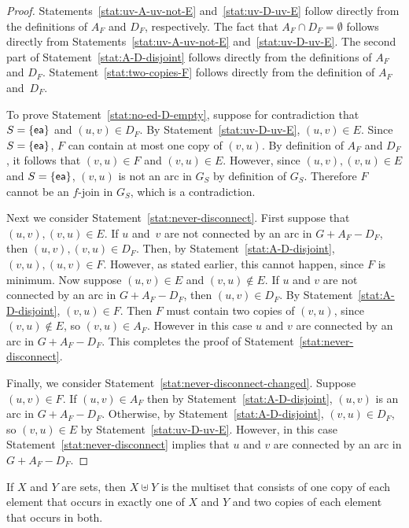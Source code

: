\documentclass[11pt]{llncs}
\newcommand{\ea}{{\sf ea}}
\begin{document}
\begin{proof}
Statements~\ref{stat:uv-A-uv-not-E} and~\ref{stat:uv-D-uv-E} follow directly from the definitions of $A_F$ and
$D_F$, respectively.  The fact that $A_F\cap D_F=\emptyset$ follows directly
from Statements~\ref{stat:uv-A-uv-not-E} and~\ref{stat:uv-D-uv-E}. The second part of Statement~\ref{stat:A-D-disjoint} follows
directly from the definitions of $A_F$ and $D_F$. Statement~\ref{stat:two-copies-F} follows
directly from the definition of $A_F$ and~$D_F$.

To prove Statement~\ref{stat:no-ed-D-empty}, suppose for contradiction that $S=\{\ea\}$ and
$(u,v)\in D_F$. By Statement~\ref{stat:uv-D-uv-E}, $(u,v) \in E$.  
Since $S=\{\ea\}$, $F$ can contain at most one copy of $(v,u)$. By definition of $A_F$ and $D_F$, it follows that $(v,u) \in F$ and $(v,u) \in E$.
However, since $(u,v),(v,u) \in E$ and $S=\{\ea\}$, $(v,u)$ is not an arc in
$G_S$ by definition of $G_S$. Therefore $F$ cannot be an $f$-join in $G_S$,
which is a contradiction.

Next we consider Statement~\ref{stat:never-disconnect}. First suppose that $(u,v),(v,u) \in E$. If
$u$ and~$v$ are not connected by an arc in $G+A_F-D_F$, then $(u,v),(v,u) \in
D_F$. Then, by Statement~\ref{stat:A-D-disjoint}, $(v,u),(u,v) \in F$. However, as stated
earlier, this cannot happen, since $F$ is minimum. Now suppose $(u,v)\in E$ and
$(v,u)\notin E$. If $u$ and $v$ are not connected by an arc in $G+A_F-D_F$,
then $(u,v) \in D_F$. By Statement~\ref{stat:A-D-disjoint}, $(v,u) \in F$. Then $F$ must contain two copies of $(v,u)$, since $(v,u)\notin E$, so $(v,u) \in A_F$.
However in this case $u$ and $v$ are
connected by an arc in $G+A_F-D_F$. This completes the proof of Statement~\ref{stat:never-disconnect}.

Finally, we consider Statement~\ref{stat:never-disconnect-changed}. Suppose $(u,v) \in F$. If $(u,v) \in A_F$
then by Statement~\ref{stat:A-D-disjoint}, $(u,v)$ is an arc in $G+A_F-D_F$. Otherwise, by
Statement~\ref{stat:A-D-disjoint}, $(v,u) \in D_F$, so $(v,u)\in E$ by Statement~\ref{stat:uv-D-uv-E}. However,
in this case Statement~\ref{stat:never-disconnect} implies that $u$ and $v$ are connected by an arc in
$G+A_F-D_F$.
\end{proof}

If $X$ and $Y$ are sets, then $X \uplus Y$  is the multiset that consists of one
copy of each element that occurs in exactly one of $X$ and $Y$ and two copies
of each element that occurs in both.
\end{document}
